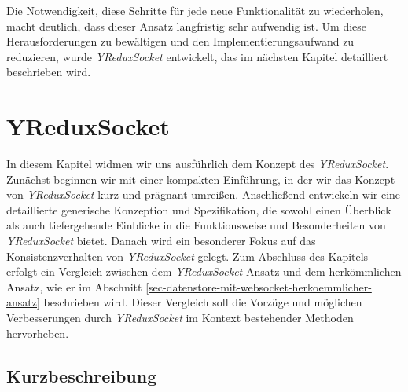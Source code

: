 \documentclass[12pt]{book}          %
\begin{document}
Die Notwendigkeit, diese Schritte für jede neue Funktionalität zu wiederholen, macht deutlich, dass dieser Ansatz langfristig sehr aufwendig ist. Um diese Herausforderungen zu bewältigen und den Implementierungsaufwand zu reduzieren, wurde \textit{YReduxSocket} entwickelt, das im nächsten Kapitel detailliert beschrieben wird.

\chapter{YReduxSocket}
\label{chap-y-redux-socket}

In diesem Kapitel widmen wir uns ausführlich dem Konzept des \textit{YReduxSocket}. Zunächst beginnen wir mit einer kompakten Einführung, in der wir das Konzept von \textit{YReduxSocket} kurz und prägnant umreißen. Anschließend entwickeln wir eine detaillierte generische Konzeption und Spezifikation, die sowohl einen Überblick als auch tiefergehende Einblicke in die Funktionsweise und Besonderheiten von \textit{YReduxSocket} bietet. Danach wird ein besonderer Fokus auf das Konsistenzverhalten von \textit{YReduxSocket} gelegt. Zum Abschluss des Kapitels erfolgt ein Vergleich zwischen dem \textit{YReduxSocket}-Ansatz und dem herkömmlichen Ansatz, wie er im Abschnitt \ref{sec-datenstore-mit-websocket-herkoemmlicher-ansatz} beschrieben wird. Dieser Vergleich soll die Vorzüge und möglichen Verbesserungen durch \textit{YReduxSocket} im Kontext bestehender Methoden hervorheben.

\section{Kurzbeschreibung}
\label{sec-kurzbeschreibung}
\end{document}
